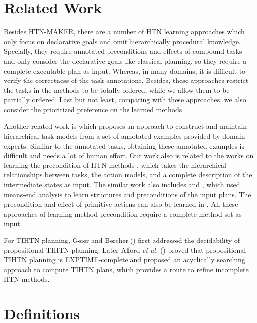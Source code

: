 \documentclass[letterpaper]{article} %
\begin{document}
\section{Related Work}
Besides HTN-MAKER, there are a number of HTN learning approaches \cite{DBLP:conf/ecai/LotinacJ16,DBLP:journals/ai/ZhuoM014}
which only focus on declarative goals and omit hierarchically procedural knowledge.
Specially, they require annotated preconditions and effects of compound tasks and only consider the declarative goals like classical planning, so they require a complete executable plan as input. Whereas, %
in many domains, it is difficult to verify the correctness of the task annotations. %
Besides, these approaches restrict the tasks in the methods to be totally ordered, while we allow them to be partially ordered.
Last but not least, comparing with these approaches, we also consider the prioritized preference on the learned methods. %

Another related work is \cite{DBLP:conf/kcap/GarlandRR01} which proposes an approach to construct and maintain hierarchical task models from a set of annotated examples provided by domain experts.
Similar to the annotated tasks, obtaining these annotated examples is difficult and needs a lot of human effort.
Our work also is related to the works on learning the precondition of HTN methods \cite{DBLP:conf/icml/IlghamiMNA05,DBLP:conf/aaai/XuM05}, which takes the hierarchical relationships between tasks, the action models, and a complete description of the intermediate states as input. The similar work also includes \cite{DBLP:conf/icml/NejatiLK06} and \cite{ReddyT97}, which used means-end analysis to learn structures and preconditions of the input plans. The precondition and effect of primitive actions can also be learned in \cite{DBLP:conf/ijcai/ZhuoHHYM09}.
All these approaches of learning method precondition require a complete method set as input.

For TIHTN planning,
Geier and Bercher (\citeyear{geier2011decidability}) first addressed the decidability of propositional TIHTN planning.
Later Alford \emph{et al.} (\citeyear{alford2015tighttihtn}) proved that propositional TIHTN planning is EXPTIME-complete and proposed an acyclically searching approach to compute TIHTN plans, which provides a route to refine incomplete HTN methods.

\section{Definitions}
\end{document}
